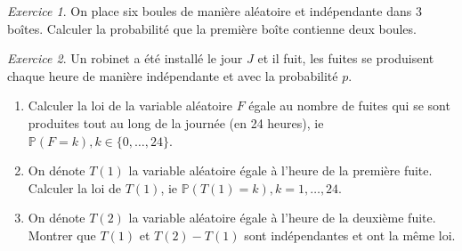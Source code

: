 \documentclass[french]{book}
\theoremstyle{definition}
\theoremstyle{remark}
\newtheorem{exo}{Exercice}
\begin{document}
\begin{exo}
  On place six boules de manière aléatoire et indépendante dans 3 boîtes. Calculer la probabilité que la première boîte contienne deux boules.
\end{exo}

\begin{exo}
  Un robinet a été installé le jour \(J\) et il fuit, les fuites se produisent chaque heure de manière indépendante et avec la probabilité \(p\).

  \begin{enumerate}
    \item Calculer la loi de la variable aléatoire \(F\) égale au nombre de fuites qui se sont produites tout au long de la journée (en 24 heures), ie \(\mathbb{P}(F=k), k \in \{ 0, \dots, 24 \}\).
    \item On dénote \(T(1)\) la variable aléatoire égale à l'heure de la première fuite. Calculer la loi de \(T(1)\), ie \(\mathbb{P}(T(1) = k), k=1, \dots, 24\).
    \item On dénote \(T(2)\) la variable aléatoire égale à l'heure de la deuxième fuite. Montrer que \(T(1)\) et \(T(2)-T(1)\) sont indépendantes et ont la même loi.
  \end{enumerate}
\end{exo}
\end{document}
